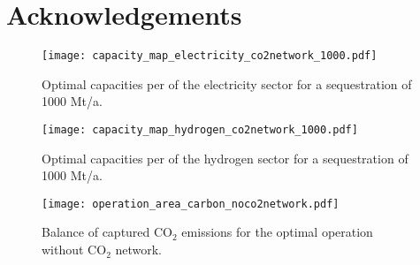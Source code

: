 \documentclass[conference]{IEEEtran}
\begin{document}
\section*{Acknowledgements}
\label{sec:acknowledgements}


\newpage

\printbibliography

\appendix

\begin{figure}[h]
    \centering
    \texttt{[image: capacity\_map\_electricity\_co2network\_1000.pdf]}
    \caption{Optimal capacities per of the electricity sector for a sequestration of 1000 Mt/a.}
    \label{fig:capacity_map_electricity_co2network_1000}
\end{figure}


\begin{figure}[h]
    \centering
    \texttt{[image: capacity\_map\_hydrogen\_co2network\_1000.pdf]}
    \caption{Optimal capacities per of the hydrogen sector for a sequestration of 1000 Mt/a.}
    \label{fig:capacity_map_hydrogen_co2network_1000}
\end{figure}

\begin{figure}
    \centering
    \texttt{[image: operation\_area\_carbon\_noco2network.pdf]}
    \caption{Balance of captured CO$_2$ emissions for the optimal operation without CO$_2$ network.}
    \label{fig:operation_area_carbon_noco2network}
\end{figure}
\end{document}
